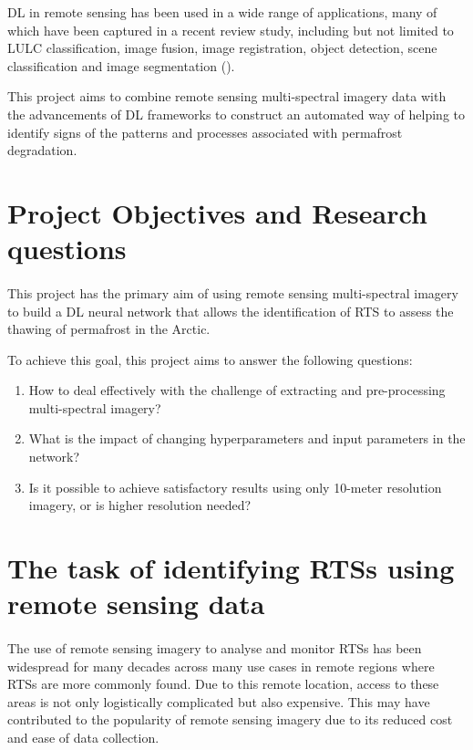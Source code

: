 \gls{DL} in remote sensing has been used in a wide range of applications, many of which have been captured in a recent review study, including but not limited to \gls{LULC} classification, image fusion, image registration, object detection, scene classification and image segmentation (\cite{MA2019166}).

This project aims to combine remote sensing multi-spectral imagery data with the advancements of \gls{DL} frameworks to construct an automated way of helping to identify signs of the patterns and processes associated with permafrost degradation.

\section{Project Objectives and Research questions} \label{projectqs}
\paragraph{}
This project has the primary aim of using remote sensing multi-spectral imagery to build a \gls{DL} neural network that allows the identification of \gls{RTS} to assess the thawing of permafrost in the Arctic.

To achieve this goal, this project aims to answer the following questions:

\begin{enumerate}
    \item How to deal effectively with the challenge of extracting and pre-processing multi-spectral imagery?
    \item What is the impact of changing hyperparameters and input parameters in the network?
    \item Is it possible to achieve satisfactory results using only 10-meter resolution imagery, or is higher resolution needed?
\end{enumerate}

\section{The task of identifying \gls{RTS}s using remote sensing data} \label{rts_task}
\paragraph{}
The use of remote sensing imagery to analyse and monitor \gls{RTS}s has been widespread for many decades across many use cases in remote regions where \gls{RTS}s are more commonly found. Due to this remote location, access to these areas is not only logistically complicated but also expensive. This may have contributed to the popularity of remote sensing imagery due to its reduced cost and ease of data collection.

